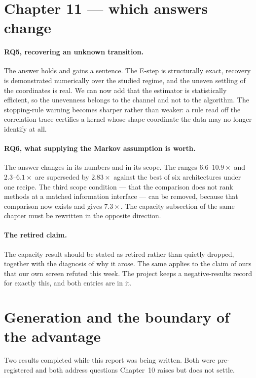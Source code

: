 \documentclass[11pt,a4paper]{article}
\begin{document}
\section{Chapter 11 --- which answers change}\label{sec:ch11}

\paragraph{RQ5, recovering an unknown transition.}
The answer holds and gains a sentence. The E-step is structurally exact, recovery is demonstrated
numerically over the studied regime, and the uneven settling of the coordinates is real. We can now
add that the estimator is statistically efficient, so the unevenness belongs to the channel and not
to the algorithm. The stopping-rule warning becomes sharper rather than weaker: a rule read off the
correlation trace certifies a kernel whose shape coordinate the data may no longer identify at all.

\paragraph{RQ6, what supplying the Markov assumption is worth.}
The answer changes in its numbers and in its scope. The ranges $6.6$--$10.9\times$ and
$2.3$--$6.1\times$ are superseded by $2.83\times$ against the best of six architectures under one
recipe. The third scope condition --- that the comparison does not rank methods at a matched
information interface --- can be removed, because that comparison now exists and gives
$7.3\times$. The capacity subsection of the same chapter must be rewritten in the opposite
direction.

\paragraph{The retired claim.}
The capacity result should be stated as retired rather than quietly dropped, together with the
diagnosis of why it arose. The same applies to the claim of ours that our own screen refuted this
week. The project keeps a negative-results record for exactly this, and both entries are in it.

\section{Generation and the boundary of the advantage}\label{sec:gen}

Two results completed while this report was being written. Both were pre-registered and both
address questions Chapter~10 raises but does not settle.
\end{document}
